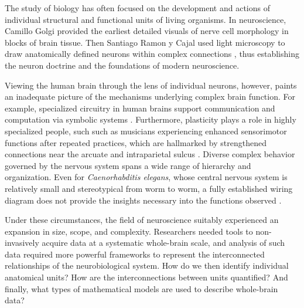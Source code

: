 The study of biology has often focused on the development and actions of individual structural and functional units of living organisms. In neuroscience, Camillo Golgi provided the earliest detailed visuals of nerve cell morphology in blocks of brain tissue\cite{jones1999golgi}. Then Santiago Ramon y Cajal used light microscopy to draw anatomically defined neurons within complex connections \cite{y1888estructura}, thus establishing the neuron doctrine and the foundations of modern neuroscience. 

Viewing the human brain through the lens of individual neurons, however, paints an inadequate picture of the mechanisms underlying complex brain function. For example, specialized circuitry in human brains support communication and computation via symbolic systems \cite{nieder_counting_2005,diester_semantic_2007,warren_mechanisms_2011}. Furthermore, plasticity plays a role in highly specialized people, such such as musicians experiencing enhanced sensorimotor functions after repeated practices, which are hallmarked by strengthened connections near the arcuate and intraparietal sulcus \cite{wan_music_2010}. Diverse complex behavior governed by the nervous system spans a wide range of hierarchy and organization. Even for \textit{Caenorhabditis elegans}, whose central nervous system is relatively small and stereotypical from worm to worm, a fully established wiring diagram does not provide the insights necessary into the functions observed \cite{varshney2011structural}.

Under these circumstances, the field of neuroscience suitably experienced an expansion in size, scope, and complexity. Researchers needed tools to non-invasively acquire data at a systematic whole-brain scale, and analysis of such data required more powerful frameworks to represent the interconnected relationships of the neurobiological system. How do we then identify individual anatomical units? How are the interconnections between units quantified? And finally, what types of mathematical models are used to describe whole-brain data? 




